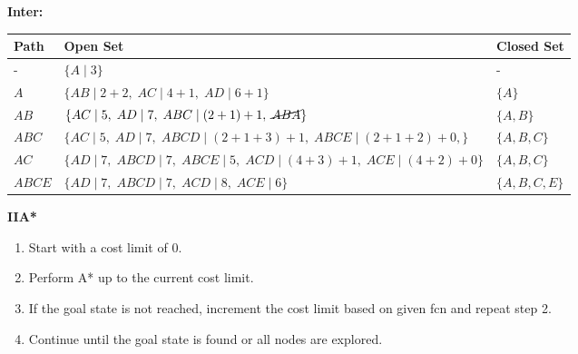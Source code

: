 \begin{example}
    \textbf{Inter:}
    \begin{center}
        \begin{tabular}{lll}
        \toprule
        \textbf{Path} & \textbf{Open Set} & \textbf{Closed Set} \\
        \midrule
        - & $\{A \mid 3 \}$ & - \\
        $A$ & $\{AB \mid 2 + 2, \; AC \mid 4 + 1, \; AD \mid 6 + 1\}$ & $\{A\}$ \\
        $AB$ & $\{AC \mid 5, \; AD \mid 7, \; ABC \mid (2 + 1) + 1, \; \cancel{ABA} \}$ & $\{A, B\}$ \\
        $ABC$ & $\{AC \mid 5, \; AD \mid 7, \; ABCD \mid (2 + 1 + 3) + 1, \; ABCE \mid (2 + 1 + 2) + 0, \}$ & $\{A, B, C\}$ \\
        $AC$ & $\{AD \mid 7, \; ABCD \mid 7, \; ABCE \mid 5, \; ACD \mid (4 + 3) + 1, \; ACE \mid (4 + 2) + 0\}$ & $\{A, B, C\}$ \\
        $ABCE$ & $\{AD \mid 7, \; ABCD \mid 7, \; ACD \mid 8, \; ACE \mid 6 \}$ & $\{A, B, C, E\}$ \\
        \bottomrule
        \end{tabular}
    \end{center}
\end{example}
\newpage

\begin{process} \textbf{IIA*}
    \begin{enumerate}
        \item Start with a cost limit of 0.
        \item Perform A* up to the current cost limit.
        \item If the goal state is not reached, increment the cost limit based on given fcn and repeat step 2.
        \item Continue until the goal state is found or all nodes are explored.
    \end{enumerate}
\end{process}

